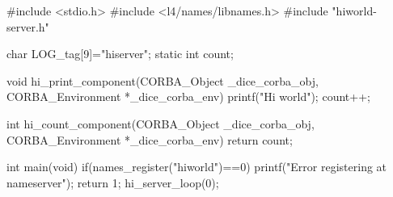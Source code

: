 #include <stdio.h>
#include <l4/names/libnames.h>
#include "hiworld-server.h"

char LOG_tag[9]="hiserver";
static int count;

void
hi_print_component(CORBA_Object _dice_corba_obj,
                   CORBA_Environment *_dice_corba_env){
    printf("Hi world\n");
    count++;
}

int
hi_count_component(CORBA_Object _dice_corba_obj,
                   CORBA_Environment *_dice_corba_env){
    return count;
}

int main(void){
    if(names_register("hiworld")==0){
      printf("Error registering at nameserver\n");
      return 1;
    }
    hi_server_loop(0);
}
